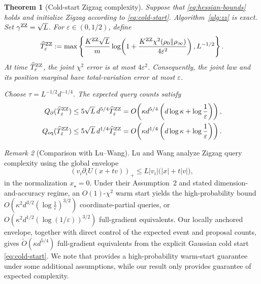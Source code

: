 \documentclass{amsart}
\theoremstyle{plain}
\newtheorem{theorem}{Theorem}
\theoremstyle{definition}
\theoremstyle{remark}
\newtheorem{remark}[theorem]{Remark}    %
\newcommand{\abs}[1]{\lvert#1\rvert}
\newcommand{\1}{\mathbf 1}
\newcommand{\pos}[1]{\left(#1\right)_+}
\newcommand{\zz}{{\rm ZZ}}
\begin{document}
\begin{theorem}[Cold-start Zigzag complexity]\label{thm:zz-complexity}
Suppose that \eqref{eq:hessian-bounds} holds and initialize Zigzag according
to \eqref{eq:cold-start}.  Algorithm~\ref{alg:zz} is exact.  Set
$\gamma^{\zz}=\sqrt L$.  For $\varepsilon\in(0,1/2)$, define
\begin{equation}\label{eq:zz-horizon}
        \widehat T_\varepsilon^{\zz}
        :=\max\left\{
          \frac{K^{\zz}\sqrt L}{m}
          \log\!\left(
            1+\frac{K^{\zz}\chi^2(\rho_0\Vert\rho_\infty)}
                     {4\varepsilon^2}\right),
          L^{-1/2}\right\}.
\end{equation}
At time $\widehat T_\varepsilon^{\zz}$, the joint $\chi^2$ error is at most
$4\varepsilon^2$.  Consequently, the joint law and its position marginal
have total-variation error at most $\varepsilon$.

Choose  $\tau=L^{-1/2}d^{-1/4}$. The expected query counts satisfy
\begin{equation}\label{eq:zz-cold-complexity}
\begin{aligned}
        Q_\partial(\widehat T_\varepsilon^{\zz})
        &\le5\sqrt L\,d^{5/4}\widehat T_\varepsilon^{\zz}
        =O\!\left(\kappa d^{5/4}
             \left(d\log\kappa+\log\frac1\varepsilon\right)\right),\\
        Q_{\rm eq}(\widehat T_\varepsilon^{\zz})
        &\le5\sqrt L\,d^{1/4}\widehat T_\varepsilon^{\zz}
        =O\!\left(\kappa d^{1/4}
             \left(d\log\kappa+\log\frac1\varepsilon\right)\right).
\end{aligned}
\end{equation}
\end{theorem}

\begin{remark}[Comparison with Lu--Wang]\label{rem:zz-comparison}
Lu and Wang \cite[Theorem~1]{LuWangZigzag} analyze Zigzag query complexity
using the global envelope
\[
        \pos{v_i\partial_iU(x+tv)}
        \le L\abs{v_i}\bigl(\abs x+t\abs v\bigr),
\]
in the normalization $x_\star=0$.  Under their Assumption~2 and stated
dimension-and-accuracy regime, an $O(1)$-$\chi^2$ warm start yields the
high-probability bound
$O(\kappa^2d^{3/2}(\log\frac1\varepsilon)^{3/2})$ coordinate-partial
queries, or
$O(\kappa^2d^{1/2}(\log(1/\varepsilon))^{3/2})$ full-gradient equivalents.
Our locally anchored envelope, together with direct control of the expected
event and proposal counts, gives
$\widetilde O(\kappa d^{5/4})$ full-gradient equivalents from the explicit
Gaussian cold start \eqref{eq:cold-start}. We note that \cite{LuWangZigzag} provides a
high-probability warm-start guarantee under some additional assumptions, while our result only provides guarantee of expected complexity.
\end{remark}
\end{document}
